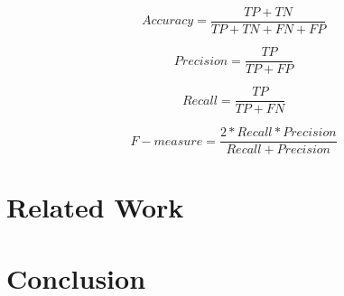 \documentclass{acm_proc_article-sp}
\begin{document}
\begin{equation}
Accuracy = \frac{TP+TN}{TP+TN+FN+FP}
\end{equation}

\begin{equation}
Precision = \frac{TP}{TP+FP}
\end{equation}

\begin{equation}
Recall = \frac{TP}{TP+FN}
\end{equation}

\begin{equation}
F-measure = \frac{2*Recall*Precision}{Recall+Precision}
\end{equation}


\section{Related Work} \label{related}


\section{Conclusion} \label{conclusion}




%

%
%
\end{document}
